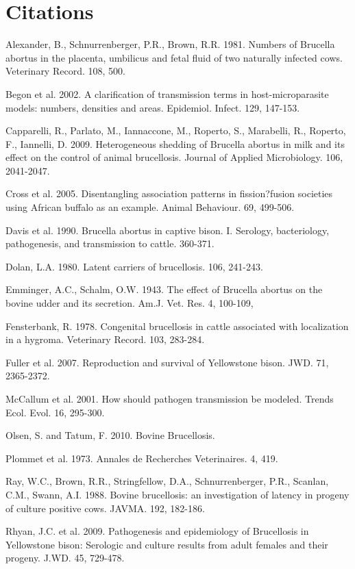 \documentclass[letterpaper,12pt]{article}
\begin{document}
\section*{Citations}

Alexander, B., Schnurrenberger, P.R., Brown, R.R. 1981. Numbers of Brucella abortus in the placenta, umbilicus and fetal fluid of two naturally infected cows. Veterinary Record. 108, 500. 

Begon et al. 2002. A clarification of transmission terms in host-microparasite models: numbers, densities and areas. Epidemiol. Infect. 129, 147-153.

Capparelli, R., Parlato, M., Iannaccone, M., Roperto, S., Marabelli, R., Roperto, F., Iannelli, D. 2009. Heterogeneous shedding of Brucella abortus in milk and its effect on the control of animal brucellosis. Journal of Applied Microbiology. 106, 2041-2047.

Cross et al. 2005. Disentangling association patterns in fission?fusion societies using African buffalo as an example. Animal Behaviour. 69, 499-506.

Davis et al. 1990. Brucella abortus in captive bison. I. Serology, bacteriology, pathogenesis, and transmission to cattle. 360-371.

Dolan, L.A. 1980. Latent carriers of brucellosis. 106, 241-243. 

Emminger, A.C., Schalm, O.W. 1943. The effect of Brucella abortus on the bovine udder and its secretion. Am.J. Vet. Res. 4, 100-109, 

Fensterbank, R. 1978. Congenital brucellosis in cattle associated with localization in a hygroma. Veterinary Record. 103, 283-284.

Fuller et al. 2007. Reproduction and survival of Yellowstone bison. JWD. 71, 2365-2372.

McCallum et al. 2001. How should pathogen transmission be modeled. Trends Ecol. Evol. 16, 295-300.

Olsen, S. and Tatum, F. 2010. Bovine Brucellosis.

Plommet et al. 1973. Annales de Recherches Veterinaires. 4, 419. %

Ray, W.C., Brown, R.R., Stringfellow, D.A., Schnurrenberger, P.R., Scanlan, C.M., Swann, A.I. 1988. Bovine brucellosis: an investigation of latency in progeny of culture positive cows. JAVMA. 192, 182-186.

Rhyan, J.C. et al. 2009. Pathogenesis and epidemiology of Brucellosis in Yellowstone bison: Serologic and culture results from adult females and their progeny. J.WD. 45, 729-478.
\end{document}
